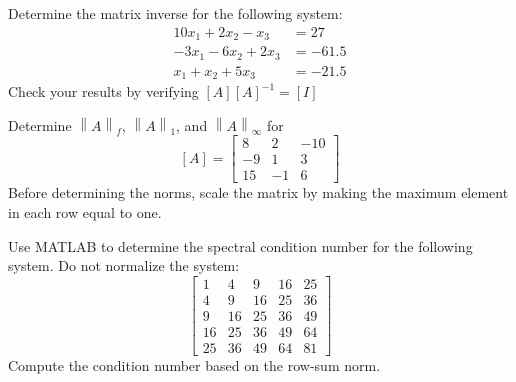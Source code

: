 \documentclass{article}
\begin{document}
\setcounter{problem}{0}
\begin{problem}
Determine the matrix inverse for the following system:
\begin{align*}
10x_{1}	+	2x_{2}	-	x_{3}	&=	27		\\
-3x_{1}	-	6x_{2}	+	2x_{3}	&=	-61.5	\\
x_{1}	+	x_{2}	+	5x_{3}	&=	-21.5
\end{align*}
Check your results by verifying $[A][A]^{-1} = [I]$
\end{problem}

\setcounter{problem}{5}
\begin{problem}
Determine $\left\| A \right\|_{f}$, $\left\| A \right\|_{1}$, and $\left\| A \right\|_{\infty}$ for
\[ [A] =
\begin{bmatrix}
8	&	2	&	-10	\\
-9	&	1	&	3	\\
15	&	-1	&	6
\end{bmatrix}
\]
Before determining the norms, scale the matrix by making the maximum element in each row equal to one.
\end{problem}

\setcounter{problem}{7}
\begin{problem}
Use MATLAB to determine the spectral condition number for the following system. Do not normalize the system:
\[
\begin{bmatrix}
1	&	4	&	9	&	16	&	25	\\
4	&	9	&	16	&	25	&	36	\\
9	&	16	&	25	&	36	&	49	\\
16	&	25	&	36	&	49	&	64	\\
25	&	36	&	49	&	64	&	81	
\end{bmatrix}
\]
Compute the condition number based on the row-sum norm.
\end{problem}
\end{document}
